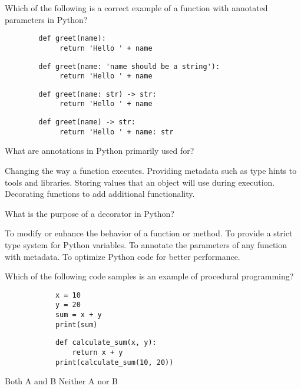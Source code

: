 \documentclass[12pt, addpoints, answers]{exam}
\begin{document}
\begin{questions}
	\question Which of the following is a correct example of a function with annotated parameters in Python?
	\begin{choices}
		\choice 
		\begin{verbatim}
        def greet(name): 
             return 'Hello ' + name 
		\end{verbatim}
		\choice 
		\begin{verbatim}
        def greet(name: 'name should be a string'): 
             return 'Hello ' + name
		\end{verbatim}
		\CorrectChoice 
		\begin{verbatim}
        def greet(name: str) -> str: 
             return 'Hello ' + name
		\end{verbatim}
		\choice
		\begin{verbatim}
        def greet(name) -> str: 
             return 'Hello ' + name: str
		\end{verbatim}
	\end{choices}
				
	\question What are annotations in Python primarily used for?
	\begin{choices}
		\choice Changing the way a function executes.
		\CorrectChoice Providing metadata such as type hints to tools and libraries.
		\choice Storing values that an object will use during execution.
		\choice Decorating functions to add additional functionality.
	\end{choices}
				
	\question What is the purpose of a decorator in Python?
	\begin{choices}
		\CorrectChoice To modify or enhance the behavior of a function or method.
		\choice To provide a strict type system for Python variables.
		\choice To annotate the parameters of any function with metadata.
		\choice To optimize Python code for better performance.
	\end{choices}

	\question Which of the following code samples is an example of procedural programming?
	\begin{choices}
		\choice
		\begin{verbatim}
			x = 10 
			y = 20 
			sum = x + y 
			print(sum) 
		\end{verbatim}
		\CorrectChoice 
		\begin{verbatim}
			def calculate_sum(x, y): 
			    return x + y 
			print(calculate_sum(10, 20)) 
		\end{verbatim}
		\choice Both A and B
		\choice Neither A nor B
	\end{choices}
				

\end{questions}
\end{document}
